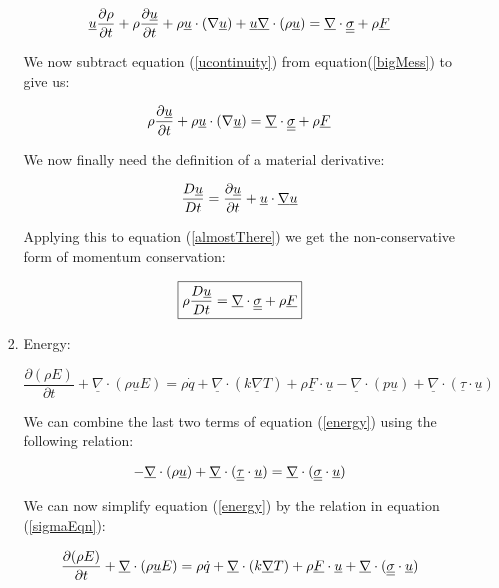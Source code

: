 \documentclass{article}
\begin{document}
\begin{enumerate}
\begin{enumerate}
\begin{enumerate}
\begin{equation}
\underline{u} \frac{\partial \rho}{\partial t} + \rho \frac{\partial \underline{u}}{\partial t} + \rho \underline{u} \cdot (\nabla \underline{u}) + \underline{u}\underline{\nabla}\cdot(\rho \underline{u}) = \underline{\nabla}\cdot \underline{\underline{\sigma}} + \rho \underline{F}
\label{bigMess}
\end{equation}

We now subtract equation (\ref{ucontinuity}) from equation(\ref{bigMess}) to give us:

\begin{equation}
\rho \frac{\partial \underline{u}}{\partial t} + \rho \underline{u} \cdot(\nabla \underline{u}) = \underline{\nabla}\cdot\underline{\underline{\sigma}} + \rho \underline{F}
\label{almostThere}
\end{equation}

We now finally need the definition of a material derivative:

\begin{equation}
\frac{D\underline{u}}{Dt} = \frac{\partial \underline{u}}{\partial t} + \underline{u}\cdot\underline{\nabla}\underline{u}
\end{equation}

Applying this to equation (\ref{almostThere}) we get the non-conservative form of momentum conservation:

\begin{equation}
\boxed{\rho \frac{D\underline{u}}{Dt} = \underline{\nabla}\cdot\underline{\underline{\sigma}} + \rho \underline{F}}
\end{equation}

\item Energy:

\begin{equation}
\frac{\partial(\rho E)}{\partial t} + \underline{\nabla}\cdot(\rho\underline{u}E)=\rho \dot{q}+\underline{\nabla}\cdot(k\underline{\nabla}T)+\rho\underline{F}\cdot\underline{u}-\underline{\nabla} \cdot (p \underline{u})+\underline{\nabla}\cdot(\underline{\tau}\cdot\underline{u})
\label{energy}
\end{equation}

We can combine the last two terms of equation (\ref{energy}) using the following relation:

\begin{equation}
-\underline{\nabla}\cdot(\rho\underline{u}) + \underline{\nabla}\cdot(\underline{\underline{\tau}}\cdot\underline{u}) = \underline{\nabla}\cdot(\underline{\underline{\sigma}}\cdot\underline{u})
\label{sigmaEqn}
\end{equation}

We can now simplify equation (\ref{energy}) by the relation in equation (\ref{sigmaEqn}):

\begin{equation}
\frac{\partial(\rho E)}{\partial t} + \underline{\nabla}\cdot(\rho\underline{u}E)=\rho \dot{q}+\underline{\nabla}\cdot(k\underline{\nabla}T)+\rho\underline{F}\cdot\underline{u}+\underline{\nabla}\cdot(\underline{\underline{\sigma}}\cdot\underline{u})
\label{energySimple}
\end{equation}


\end{enumerate}
\end{enumerate}
\end{enumerate}
\end{document}
